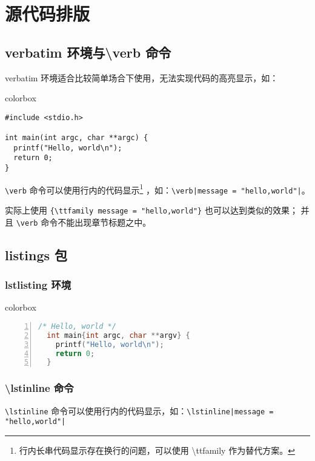 \chapter{源代码排版}

\section{{\ttfamily verbatim} 环境与{\ttfamily \textbackslash verb} 命令}

{\ttfamily verbatim} 环境适合比较简单场合下使用，无法实现代码的高亮显示，如：

\begin{latexcode}{colorbox}
\begin{verbatim}
#include <stdio.h>

int main(int argc, char **argc) {
  printf("Hello, world\n");
  return 0;
}
\end{verbatim}
\end{latexcode}

\verb|\verb| 命令可以使用行内的代码显示\footnote{行内长串代码显示存在换行的问题，可以使用 {\ttfamily \textbackslash ttfamily} 作为替代方案。}
，如：\verb!\verb|message = "hello,world"|!。

实际上使用 \verb|{\ttfamily message = "hello,world"}| 也可以达到类似的效果；
并且 \verb|\verb| 命令不能出现章节标题之中。

\section{listings 包}

\subsection{{\ttfamily lstlisting} 环境}

\begin{latexcode}{colorbox}
\begin{lstlisting}[language=C,caption={C/C++ 语言},numbers=left]
  /* Hello, world */
  int main{int argc, char **argv} {
    printf("Hello, world\n");
    return 0;
  }
\end{lstlisting}
\end{latexcode}

\subsection{{\ttfamily \textbackslash lstinline} 命令}

\verb|\lstinline| 命令可以使用行内的代码显示，如：\verb!\lstinline|message = "hello,world"|!

